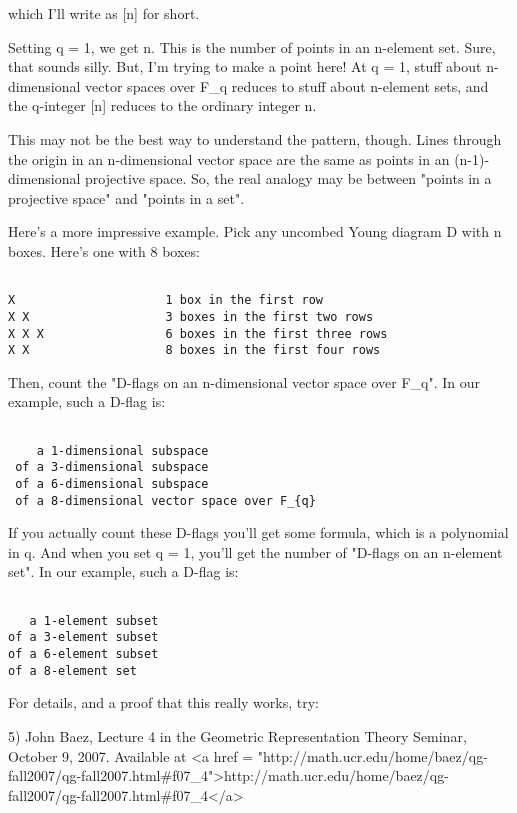 which I'll write as [n] for short.  

Setting q = 1, we get n.  This is the number of points in an n-element
set.  Sure, that sounds silly.  But, I'm trying to make a point here!
At q = 1, stuff about n-dimensional vector spaces over F_{q}
reduces to stuff about n-element sets, and the q-integer [n] reduces
to the ordinary integer n.

This may not be the best way to understand the pattern, though.
Lines through the origin in an n-dimensional vector space are the 
same as points in an (n-1)-dimensional projective space.  So, the
real analogy may be between "points in a projective space" and 
"points in a set".

Here's a more impressive example.   Pick any uncombed Young diagram D 
with n boxes.  Here's one with 8 boxes:


\begin{verbatim}

X                     1 box in the first row
X X                   3 boxes in the first two rows
X X X                 6 boxes in the first three rows
X X                   8 boxes in the first four rows
\end{verbatim}
    

Then, count the "D-flags on an n-dimensional vector space over
F_{q}".  In our example, such a D-flag is:


\begin{verbatim}

    a 1-dimensional subspace
 of a 3-dimensional subspace
 of a 6-dimensional subspace
 of a 8-dimensional vector space over F_{q}
\end{verbatim}
    
If you actually count these D-flags you'll get some formula, which is 
a polynomial in q.  And when you set q = 1, you'll get the number of 
"D-flags on an n-element set".  In our example, such a D-flag is:


\begin{verbatim}

   a 1-element subset 
of a 3-element subset
of a 6-element subset
of a 8-element set
\end{verbatim}
    
For details, and a proof that this really works, try:

5) John Baez, Lecture 4 in the Geometric Representation Theory
Seminar, October 9, 2007.  Available at 
<a href = "http://math.ucr.edu/home/baez/qg-fall2007/qg-fall2007.html#f07_4">http://math.ucr.edu/home/baez/qg-fall2007/qg-fall2007.html#f07_4</a>

